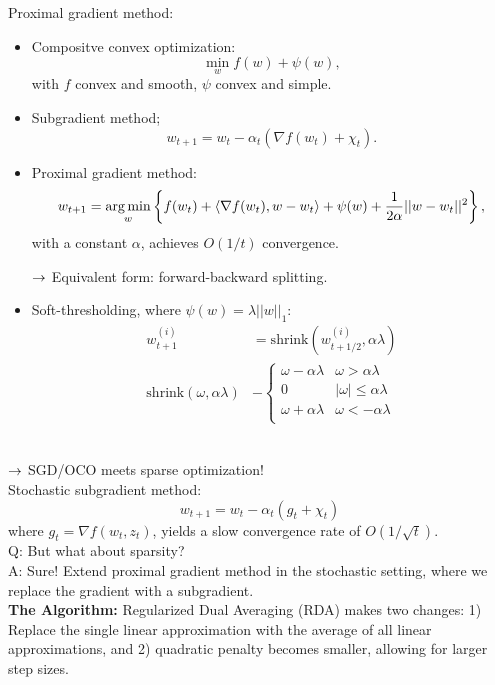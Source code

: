 Proximal gradient method:
\begin{itemize}
    \item Compositve convex optimization:
    \[
    \min_w f(w) + \psi(w),
    \]
    with $f$ convex and smooth, $\psi$ convex and simple.
    \item Subgradient method;
    \[
    w_{t+1} = w_t - \alpha_t (\nabla f(w_t) +\chi_t).
    \]
    \item Proximal gradient method:
    \[
    w_{t+1} = \operatorname*{arg\,min}_w \left\{f(w_t) + \langle \nabla f(w_t), w-w_t\rangle + \psi(w) + \frac{1}{2\alpha} ||w - w_t||^2\right\},
    \]
    with a constant $\alpha$, achieves $O(1/t)$ convergence.
    
    $\rightarrow$ Equivalent form: forward-backward splitting.
    
    \item Soft-thresholding, where $\psi(w) = \lambda ||w||_1$:
    \begin{align}
        w_{t+1}^(i) &= \text{shrink}\left(w_{t+1/2}^{(i)}, \alpha\lambda\right) \\
        \text{shrink}\left(\omega, \alpha\lambda\right) &- \begin{cases}
        \omega - \alpha\lambda& \omega > \alpha\lambda \\
        0& |\omega| \leq \alpha\lambda \\
        \omega + \alpha\lambda& \omega < -\alpha\lambda \\
        \end{cases}
    \end{align}
\end{itemize}

 \\

$\rightarrow$ SGD/OCO meets sparse optimization! \\

Stochastic subgradient method:
\[
w_{t+1} = w_t - \alpha_t (g_t + \chi_t)
\]
where $g_t = \nabla f(w_t,z_t)$, yields a slow convergence rate of $O(1/\sqrt{t})$. \\

Q: But what about sparsity? \\

A: Sure! Extend proximal gradient method in the stochastic setting, where we replace the gradient with a subgradient. \\

{\bf The Algorithm:} Regularized Dual Averaging (RDA) makes two changes: 1) Replace the single linear approximation with the average of all linear approximations, and 2) quadratic penalty becomes smaller, allowing for larger step sizes. \\

